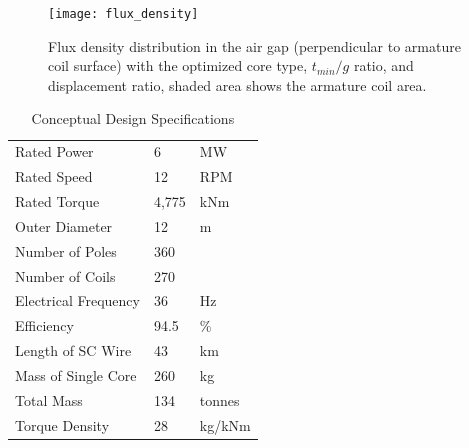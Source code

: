 \documentclass[final,peerreview,onecolumn]{IEEEtran}
\begin{document}
\begin{figure}[t]
\centering
\texttt{[image: flux\_density]}
\caption{Flux density distribution in the air gap (perpendicular to armature coil surface) with the optimized core type, $t_{min}/g$ ratio, and displacement ratio, shaded area shows the armature coil area.}
\label{flux_density}
\end{figure}


\begin{table}[h]
\caption{Conceptual Design Specifications}
\label{generator_specs}
\centering
\begin{tabular}{lll}
\hline
\hline
Rated Power & 6 & MW \\
Rated Speed & 12 & RPM \\
Rated Torque & 4,775 & kNm \\
Outer Diameter & 12 & m \\
Number of Poles & 360 \\
Number of Coils & 270 \\
Electrical Frequency & 36 & Hz \\
Efficiency & 94.5 & \% \\
Length of SC Wire & 43 & km\\
Mass of Single Core & 260 & kg \\
Total Mass & 134 & tonnes \\
Torque Density & 28 & kg/kNm \\
\hline
\hline
\end{tabular}
\end{table}
\end{document}
